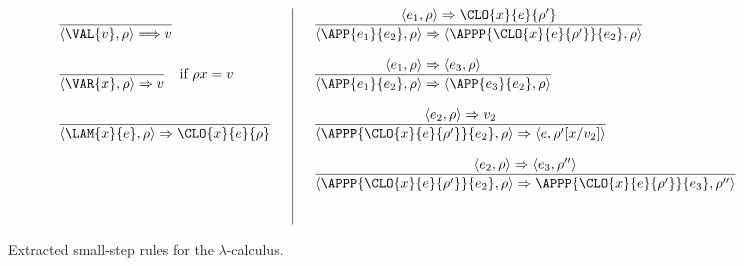 \begin{figure}
\[
\begin{array}{l|l}
 \dfrac{ } 
{\langle \VAL{v}, \rho \rangle \Longrightarrow v}
 ~~~&~~~
 \dfrac{\langle e_1, \rho \rangle \Rightarrow \CLO{x}{e}{\rho'} } 
{\langle \APP{e_1}{e_2}, \rho \rangle \Rightarrow \langle \APPP{\CLO{x}{e}{\rho'}}{e_2},\rho\rangle}
 \\
 \\
  \dfrac{ } 
{\langle \VAR{x}, \rho \rangle \Rightarrow v}

 ~~~\text{if }  \rho x = v
&~~~
 \dfrac{\langle e_1, \rho \rangle \Rightarrow \langle e_3, \rho \rangle } 
{\langle \APP{e_1}{e_2}, \rho \rangle \Rightarrow \langle \APP{e_3}{e_2},\rho\rangle}

\\
 \\
 
\dfrac{ } 
{\langle \LAM{x}{e}, \rho \rangle \Rightarrow \CLO{x}{e}{\rho}}~~~
&~~~
\dfrac{\langle e_2, \rho \rangle \Rightarrow v_2}
{\langle \APPP{\CLO{x}{e}{\rho'}}{e_2},\rho\rangle \Rightarrow \langle e, \rho'[x/v_2] \rangle}
\\
\\
&~~~
\dfrac{\langle e_2, \rho \rangle \Rightarrow \langle e_3, \rho'' \rangle}
{\langle \APPP{\CLO{x}{e}{\rho'}}{e_2},\rho\rangle \Rightarrow \APPP{\CLO{x}{e}{\rho'}}{e_3},\rho''\rangle}

 \\
 \\
 


~~~&~~~
 \end{array}
\]
\caption{Extracted small-step rules for the $\lambda$-calculus.}\label{small-step-rules-lambda}
\end{figure}
